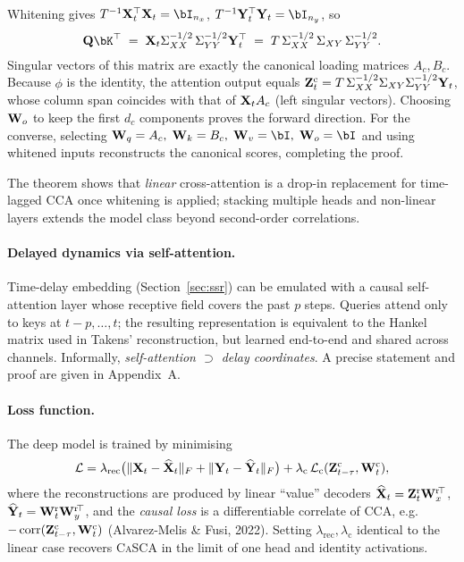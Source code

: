 \documentclass[14pt]{extarticle}
\begin{document}
	\begin{Proof}
		Whitening gives
		\(T^{-1}\bX_t^\top\bX_t=\bI_{n_x}\),
		\(T^{-1}\bY_t^\top\bY_t=\bI_{n_y}\),
		so
		\[
		\bQ\bK^\top \;=\;
		\bX_t\Sigma_{XX}^{-1/2}\,\Sigma_{YY}^{-1/2}\bY_t^\top
		\;=\;T\,\Sigma_{XX}^{-1/2}\,\Sigma_{XY}\,\Sigma_{YY}^{-1/2}.
		\]
		Singular vectors of this matrix are exactly the canonical loading
		matrices \(A_c,B_c\).
		Because \(\phi\) is the identity, the attention output equals
		\(\mathbf{Z}_t^{\mathrm c}=T\,\Sigma_{XX}^{-1/2}\Sigma_{XY}\Sigma_{YY}^{-1/2}\mathbf{Y}_t\),
		whose column span coincides with that of
		\(\mathbf{X}_tA_c\) (left singular vectors).
		Choosing \(\mathbf{W}_o\) to keep the first \(d_c\) components proves the forward
		direction.
		For the converse, selecting
		\(\bW_q=A_c,\;\bW_k=B_c,\;\bW_v=\bI,\;\bW_o=\bI\)
		and using whitened inputs reconstructs the canonical scores, completing
		the proof.
	\end{Proof}
	
	The theorem shows that \emph{linear} cross-attention is a drop-in
	replacement for time-lagged CCA once whitening is applied; stacking
	multiple heads and non-linear layers extends the model class beyond
	second-order correlations.
	
	\paragraph{Delayed dynamics via self-attention.}
	Time-delay embedding (Section~\ref{sec:ssr}) can be emulated with a causal
	self-attention layer whose receptive field covers the past
	$p$ steps.
	Queries attend only to keys at \(t-p,\dots,t\); the resulting representation
	is equivalent to the Hankel matrix used in Takens’ reconstruction,
	but learned end-to-end and shared across channels.
	Informally, \emph{self-attention \(\supset\) delay coordinates}.
	A precise statement and proof are given in Appendix~A.
	
	\paragraph{Loss function.}
	The deep model is trained by minimising
	\[
	\mathcal L
	=
	\lambda_{\mathrm{rec}}
	\bigl(
	\|\mathbf{X}_t-\widehat{\mathbf{X}}_t\|_F
	+
	\|\mathbf{Y}_t-\widehat{\mathbf{Y}}_t\|_F
	\bigr)
	+
	\lambda_{\mathrm{c}}
	\,\mathcal L_{\mathrm{c}}(\mathbf{Z}_{t-\tau}^{\mathrm c},\mathbf{W}_t^{\mathrm c}),
	\]
	where the reconstructions are produced by linear “value” decoders
	\(\widehat{\mathbf{X}}_t=\mathbf{Z}_t^{\mathrm r}\mathbf{W}_{x}^{\mathrm r\!\top}\),
	\(\widehat{\mathbf{Y}}_t=\mathbf{W}_t^{\mathrm r}\mathbf{W}_{y}^{\mathrm r\!\top}\),
	and the \emph{causal loss} is a differentiable correlate of CCA,
	e.g.\ \(-\operatorname{corr}(\mathbf{Z}_{t-\tau}^{\mathrm c},\mathbf{W}_t^{\mathrm c})\)
	(Alvarez‐Melis \& Fusi, 2022).
	Setting \(\lambda_{\mathrm{rec}},\lambda_{\mathrm{c}}\) identical to the
	linear case recovers \textsc{CaSCA} in the limit of one head and
	identity activations.
	
\end{document}
